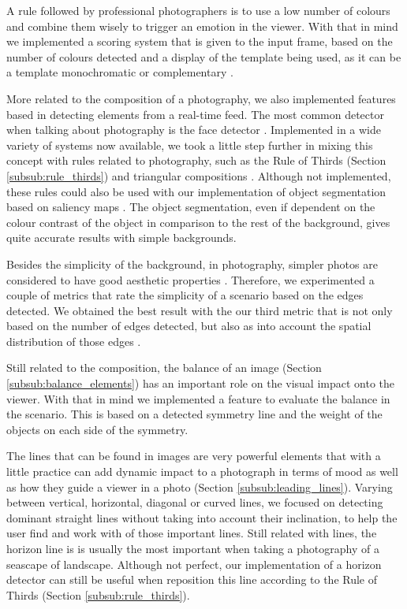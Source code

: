 A rule followed by professional photographers is to use a low number of colours and combine them wisely to trigger an emotion in the viewer. With that in mind we implemented a scoring system that is given to the input frame, based on the number of colours detected and a display of the template being used, as it can be a template monochromatic or complementary \cite{cohen2006color}.

More related to the composition of a photography, we also implemented features based in detecting elements from a real-time feed. The most common detector when talking about photography is the face detector \cite{OCV}. Implemented in a wide variety of systems now available, we took a little step further in mixing this concept with rules related to photography, such as the Rule of Thirds (Section \ref{subsub:rule_thirds}) and triangular compositions \cite{Santos}. Although not implemented, these rules could also be used with our implementation of object segmentation based on saliency maps \cite{cheng2011global}. The object segmentation, even if dependent on the colour contrast of the object in comparison to the rest of the background, gives quite accurate results with simple backgrounds.

Besides the simplicity of the background, in photography, simpler photos are considered to have good aesthetic properties \cite{kamps2012rules}. Therefore, we experimented a couple of metrics that rate the simplicity of a scenario based on the edges detected. We obtained the best result with the our third metric that is not only based on the number of edges detected, but also as into account the spatial distribution of those edges \cite{ke2006design}.

Still related to the composition, the balance of an image (Section \ref{subsub:balance_elements}) has an important role on the visual impact onto the viewer. With that in mind we implemented a feature to evaluate the balance in the scenario. This is based on a detected symmetry line and the weight of the objects on each side of the symmetry.

The lines that can be found in images are very powerful elements that with a little practice can add dynamic impact to a photograph in terms of mood as well as how they guide a viewer in a photo (Section \ref{subsub:leading_lines}). Varying between vertical, horizontal, diagonal or curved lines, we focused on detecting dominant straight lines without taking into account their inclination, to help the user find and work with of those important lines. Still related with lines, the horizon line is is usually the most important when taking a photography of a seascape of landscape. Although not perfect, our implementation of a horizon detector \cite{zafarifar2008horizon} can still be useful when reposition this line according to the Rule of Thirds (Section \ref{subsub:rule_thirds}).